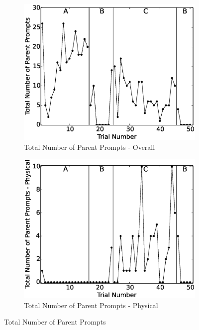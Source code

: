 \begin{figure}[h]
	\centering
	\begin{subfigure}[b]{0.49\textwidth}
		\includegraphics[width=1.1\linewidth]{./img/data_analysis/25TotalNumberofParentPrompts.eps}
		\caption{Total Number of Parent Prompts - Overall}
		\label{fig:25TotalNumberofParentPrompts}
	\end{subfigure}
	\hfill
	\begin{subfigure}[b]{0.49\textwidth}
		\includegraphics[width=1.1\linewidth]{./img/data_analysis/26TotalNumberofParentPrompts-Physical.eps}
		\caption{Total Number of Parent Prompts - Physical}
		\label{fig:26TotalNumberofParentPrompts-Physical}
	\end{subfigure}%
	\caption{Total Number of Parent Prompts}
	\label{fig:TotalNumberOfParentPrompts}
\end{figure}


